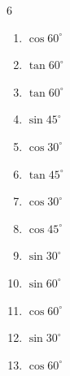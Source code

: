 \begin{multicols}{6}
\begin{enumerate}
  \item $\displaystyle \cos{60^\circ}$


  \item $\displaystyle \tan{60^\circ}$


  \item $\displaystyle \tan{60^\circ}$


  \item $\displaystyle \sin{45^\circ}$


\columnbreak %

  \item $\displaystyle \cos{30^\circ}$


  \item $\displaystyle \tan{45^\circ}$

        \phantom{$\displaystyle =1$}

  \item $\displaystyle \cos{30^\circ}$


  \item $\displaystyle \cos{45^\circ}$


  \item $\displaystyle \sin{30^\circ}$


  \item $\displaystyle \sin{60^\circ}$


  \item $\displaystyle \cos{60^\circ}$


  \item $\displaystyle \sin{30^\circ}$


  \item $\displaystyle \cos{60^\circ}$


\end{enumerate}
\end{multicols}
